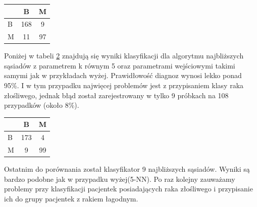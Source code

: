 \documentclass[12pt]{article}
\begin{document}
\begin{table}[H]
\begin{center}
\label{accuracy_1-NN_manhatan_bnorm} 
\begin{LARGE}
\begin{tabular}{l|c|c|}
\cline{2-3}
                        & B & M \\ \hline
\multicolumn{1}{|l|}{B} & 168 & 9 \\ \hline
\multicolumn{1}{|l|}{M} & 11 & 97 \\ \hline
\end{tabular}
\end{LARGE}
\end{center}
\end{table}

\indent Poniżej w tabeli \ref{accuracy_5-NN_manhatan_bnorm} znajdują się wyniki klasyfikacji dla algorytmu najbliższych sąsiadów z parametrem k równym 5 oraz parametrami wejściowymi takimi samymi jak w przykładach wyżej. Prawidłowość diagnoz wynosi lekko ponad 95\%. I w tym przypadku najwięcej problemów jest z przypisaniem klasy raka złośliwego, jednak błąd został zarejestrowany w tylko 9 próbkach na 108 przypadków (około 8\%).  

\begin{table}[H]
\begin{center}
\label{accuracy_5-NN_manhatan_bnorm} 
\begin{LARGE}
\begin{tabular}{l|c|c|}
\cline{2-3}
                        & B & M \\ \hline
\multicolumn{1}{|l|}{B} & 173 & 4 \\ \hline
\multicolumn{1}{|l|}{M} & 9 & 99 \\ \hline
\end{tabular}
\end{LARGE}
\end{center}
\end{table}

\indent Ostatnim do porównania został klasyfikator 9 najbliższych sąsiadów. Wyniki są bardzo podobne jak w przypadku wyżej(5-NN). Po raz kolejny zauważamy problemy przy klasyfikacji pacjentek posiadających raka złośliwego i przypisanie ich do grupy pacjentek z rakiem łagodnym.
\end{document}
